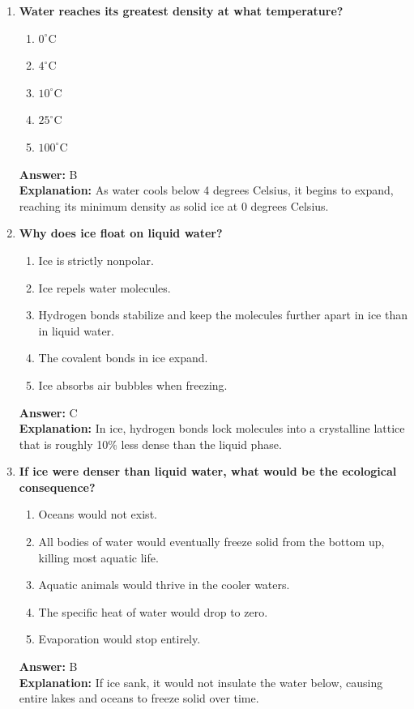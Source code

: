 \documentclass[11pt, a4paper]{article}
\begin{document}
\begin{enumerate}

\item \textbf{Water reaches its greatest density at what temperature?}
\begin{enumerate}[label=\Alph*.]
    \item $0^\circ\text{C}$
    \item $4^\circ\text{C}$
    \item $10^\circ\text{C}$
    \item $25^\circ\text{C}$
    \item $100^\circ\text{C}$
\end{enumerate}
\textbf{Answer:} B \\
\textbf{Explanation:} As water cools below 4 degrees Celsius, it begins to expand, reaching its minimum density as solid ice at 0 degrees Celsius.

\item \textbf{Why does ice float on liquid water?}
\begin{enumerate}[label=\Alph*.]
    \item Ice is strictly nonpolar.
    \item Ice repels water molecules.
    \item Hydrogen bonds stabilize and keep the molecules further apart in ice than in liquid water.
    \item The covalent bonds in ice expand.
    \item Ice absorbs air bubbles when freezing.
\end{enumerate}
\textbf{Answer:} C \\
\textbf{Explanation:} In ice, hydrogen bonds lock molecules into a crystalline lattice that is roughly 10\% less dense than the liquid phase.

\item \textbf{If ice were denser than liquid water, what would be the ecological consequence?}
\begin{enumerate}[label=\Alph*.]
    \item Oceans would not exist.
    \item All bodies of water would eventually freeze solid from the bottom up, killing most aquatic life.
    \item Aquatic animals would thrive in the cooler waters.
    \item The specific heat of water would drop to zero.
    \item Evaporation would stop entirely.
\end{enumerate}
\textbf{Answer:} B \\
\textbf{Explanation:} If ice sank, it would not insulate the water below, causing entire lakes and oceans to freeze solid over time.


\end{enumerate}
\end{document}
